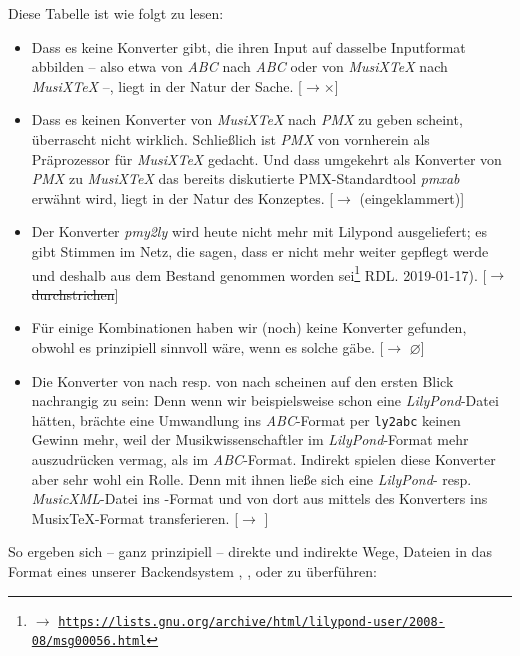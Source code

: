 Diese Tabelle ist wie folgt zu lesen:

\begin{itemize}
  \item Dass es keine Konverter gibt, die ihren Input auf dasselbe Inputformat
  abbilden -- also etwa von \textit{ABC} nach \textit{ABC} oder von
  \textit{MusiX\TeX} nach \textit{MusiX\-\TeX} --, liegt in der Natur der Sache.
  [$\rightarrow \times$] \item Dass es keinen Konverter von \textit{MusiX\TeX}
  nach \textit{PMX} zu geben scheint, überrascht nicht wirklich. Schließlich ist
  \textit{PMX} von vornherein als Präprozessor für \textit{MusiX\TeX} gedacht.
  Und dass umgekehrt als Konverter von \textit{PMX} zu \textit{MusiX\TeX} das
  bereits diskutierte PMX-Standardtool \textit{pmxab} erwähnt wird, liegt in der
  Natur des Konzeptes. [$\rightarrow$ (eingeklammert)]
  \item Der Konverter \textit{pmy2ly} wird heute nicht mehr mit Lilypond
  ausgeliefert; es gibt Stimmen im Netz, die sagen, dass er nicht mehr weiter
  gepflegt werde und deshalb aus dem Bestand genommen worden sei\footnote{$\rightarrow$
  \href{https://lists.gnu.org/archive/html/lilypond-user/2008-08/msg00056.html}{
  \texttt{https://lists.gnu.org/archive/html/lilypond-user/2008-08/msg00056.html}}}
  RDL. 2019-01-17). [$\rightarrow$ \sout{durchstrichen}]
  \item Für einige Kombinationen haben wir (noch) keine Konverter gefunden,
  obwohl es prinzipiell sinnvoll wäre, wenn es solche gäbe. [$\rightarrow$
  $\varnothing$] 
  \item Die Konverter von  nach  resp. von 
  nach  scheinen auf den ersten Blick nachrangig zu sein: Denn wenn wir
  beispielsweise schon eine \textit{LilyPond}-Datei hätten, brächte eine
  Umwandlung ins \textit{ABC}-Format per \texttt{ly2abc} keinen Gewinn mehr,
  weil der Musikwissenschaftler im \textit{LilyPond}-Format mehr auszudrücken
  vermag, als im \textit{ABC}-Format. Indirekt spielen diese Konverter aber sehr
  wohl ein Rolle. Denn mit ihnen ließe sich eine \textit{LilyPond}- resp.
  \textit{MusicXML}-Datei ins -Format und von dort aus mittels des
  Konverters  ins Musix\TeX-Format transferieren.
  [$\rightarrow$ ]
\end{itemize}

So ergeben sich -- ganz prinzipiell -- direkte und indirekte Wege,
Dateien in das Format eines unserer Backendsystem , , 
 oder  zu überführen:

